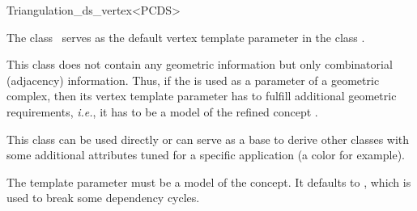 \begin{ccRefClass}{Triangulation_ds_vertex<PCDS>}

\ccDefinition

The class \ccRefName\ serves as the default vertex template parameter in the
class .

This class does not contain any geometric information but only combinatorial
(adjacency) information. Thus, if the  is
used as a parameter of a geometric complex, then its vertex template parameter
has to fulfill additional geometric requirements, \emph{i.e.}, it has to be a
model of the refined concept .

This class can be used directly or can serve as a base to derive other classes
with some additional attributes tuned for a specific application (a color for
example).


\ccParameters

The template parameter  must be a model of the
 concept. It defaults to , which is
used to break some dependency cycles.

\ccIsModel


\ccSeeAlso


\end{ccRefClass}
